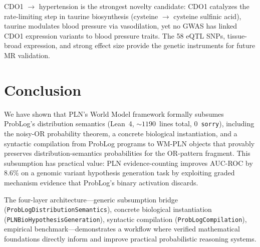 \documentclass[]{article}
\newcommand{\code}[1]{\texttt{#1}}
\begin{document}
\begin{enumerate}
  CDO1 $\to$ hypertension is the strongest novelty candidate:
  CDO1 catalyzes the rate-limiting step in taurine biosynthesis
  (cysteine $\to$ cysteine sulfinic acid), taurine modulates
  blood pressure via vasodilation, yet no GWAS has linked
  CDO1 expression variants to blood pressure traits.
  The 58 eQTL SNPs, tissue-broad expression, and strong
  effect size provide the genetic instruments for future
  MR validation.
\end{enumerate}

\section{Conclusion}
\label{sec:conclusion}

We have shown that PLN's World Model framework formally subsumes ProbLog's
distribution semantics (Lean~4, ${\sim}1190$~lines total, 0~\code{sorry}),
including the noisy-OR probability theorem, a concrete biological instantiation,
and a syntactic compilation from ProbLog programs to WM-PLN objects that provably
preserves distribution-semantics probabilities for the OR-pattern fragment.
This subsumption has practical value: PLN evidence-counting improves AUC-ROC
by $8.6\%$ on a genomic variant hypothesis generation task by exploiting graded
mechanism evidence that ProbLog's binary activation discards.

The four-layer architecture---generic subsumption bridge
(\code{ProbLogDistributionSemantics}), concrete biological instantiation
(\code{PLNBioHypothesisGeneration}), syntactic compilation
(\code{ProbLogCompilation}), empirical benchmark---demonstrates a workflow
where verified mathematical foundations directly inform and improve practical
probabilistic reasoning systems.



\end{document}

